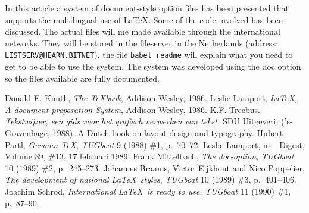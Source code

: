 \documentclass{ltugboat}
\newcommand{\file}[1]{\texttt{#1}}
\newcommand{\Lopt}[1]{\textsf{#1}}
\begin{document}
In this article a system of document-style option files has been
presented that supports the multilingual use of \LaTeX. Some of the
code involved has been discussed. The actual files will me made
available through the international networks. They will be stored in
the fileserver in the Netherlands (address:
\texttt{LISTSERV@HEARN.BITNET}), the file \file{babel readme} will
explain what you need to get to be able to use the system. The system
was developed using the \Lopt{doc} option, so the files available are
fully documented.

\begin{thebibliography}{9}
  Donald E. Knuth,
   \emph{The \TeX book}, Addison-Wesley, 1986.
  Leslie Lamport,
   \emph{\LaTeX, A document preparation System}, Addison-Wesley, 1986.
   K.F. Treebus.
  \emph{Tekstwijzer, een gids voor het grafisch verwerken van tekst.}
  SDU Uitgeverij ('s-Gravenhage, 1988). A Dutch book on layout
  design and typography.
  Hubert Partl,
   \emph{German \TeX}, \emph{TUGboat} 9 (1988) \#1, p.~70--72.
  Leslie Lamport,
   in: \TeXhax\ Digest, Volume 89, \#13, 17 februari 1989.
 Frank Mittelbach,
  \emph{The \Lopt{doc}-option},
  \emph{TUGboat} 10 (1989) \#2, p.~245--273.
 Johannes Braams, Victor Eijkhout and Nico Poppelier,
  \emph{The development of national \LaTeX\ styles},
  \emph{TUGboat} 10 (1989) \#3, p.~401--406.
 Joachim Schrod,
  \emph{International \LaTeX\ is ready to use},
  \emph{TUGboat} 11 (1990) \#1, p.~87--90.
\end{thebibliography}
\end{document}
